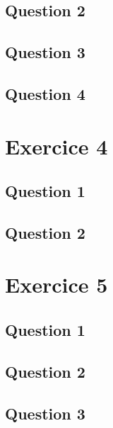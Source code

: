 \documentclass{article}
\begin{document}
\subsection*{Question 2}

\subsection*{Question 3}

\subsection*{Question 4}

\pagebreak

\section*{Exercice 4}

\subsection*{Question 1}

\subsection*{Question 2}

\pagebreak

\section*{Exercice 5}

\subsection*{Question 1}

\subsection*{Question 2}

\subsection*{Question 3}
\end{document}
